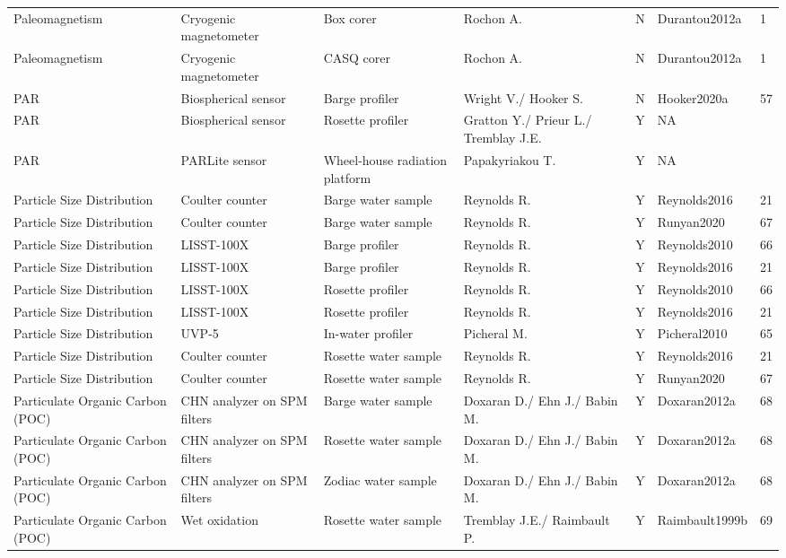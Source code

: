 \begin{ThreePartTable}
\begin{longtable}[t]{lllllll}
Paleomagnetism & Cryogenic magnetometer & Box corer & Rochon A. & N & Durantou2012a & 1\\
Paleomagnetism & Cryogenic magnetometer & CASQ corer & Rochon A. & N & Durantou2012a & 1\\
PAR & Biospherical sensor & Barge profiler & Wright V./ Hooker S. & N & Hooker2020a & 57\\
\addlinespace
PAR & Biospherical sensor & Rosette profiler & Gratton Y./ Prieur L./ Tremblay J.E. & Y & NA & \\
PAR & PARLite sensor & Wheel-house radiation platform & Papakyriakou T. & Y & NA & \\
Particle Size Distribution & Coulter counter & Barge water sample & Reynolds R. & Y & Reynolds2016 & 21\\
Particle Size Distribution & Coulter counter & Barge water sample & Reynolds R. & Y & Runyan2020 & 67\\
Particle Size Distribution & LISST-100X & Barge profiler & Reynolds R. & Y & Reynolds2010 & 66\\
\addlinespace
Particle Size Distribution & LISST-100X & Barge profiler & Reynolds R. & Y & Reynolds2016 & 21\\
Particle Size Distribution & LISST-100X & Rosette profiler & Reynolds R. & Y & Reynolds2010 & 66\\
Particle Size Distribution & LISST-100X & Rosette profiler & Reynolds R. & Y & Reynolds2016 & 21\\
Particle Size Distribution & UVP-5 & In-water profiler & Picheral M. & Y & Picheral2010 & 65\\
Particle Size Distribution & Coulter counter & Rosette water sample & Reynolds R. & Y & Reynolds2016 & 21\\
\addlinespace
Particle Size Distribution & Coulter counter & Rosette water sample & Reynolds R. & Y & Runyan2020 & 67\\
Particulate Organic Carbon (POC) & CHN analyzer on SPM filters & Barge water sample & Doxaran D./ Ehn J./ Babin M. & Y & Doxaran2012a & 68\\
Particulate Organic Carbon (POC) & CHN analyzer on SPM filters & Rosette water sample & Doxaran D./ Ehn J./ Babin M. & Y & Doxaran2012a & 68\\
Particulate Organic Carbon (POC) & CHN analyzer on SPM filters & Zodiac water sample & Doxaran D./ Ehn J./ Babin M. & Y & Doxaran2012a & 68\\
Particulate Organic Carbon (POC) & Wet oxidation & Rosette water sample & Tremblay J.E./ Raimbault P. & Y & Raimbault1999b & 69\\

\end{longtable}
\end{ThreePartTable}
